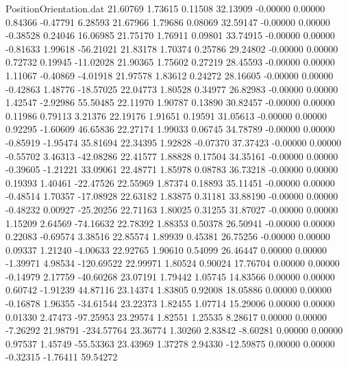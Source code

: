 \begin{filecontents}{PositionOrientation.dat}
  21.60769    1.73615    0.11508    32.13909   -0.00000    0.00000    0.84366   -0.47791    6.28593
  21.67966    1.79686    0.08069    32.59147   -0.00000    0.00000   -0.38528    0.24046   16.06985
  21.75170    1.76911    0.09801    33.74915   -0.00000    0.00000   -0.81633    1.99618  -56.21021
  21.83178    1.70374    0.25786    29.24802   -0.00000    0.00000    0.72732    0.19945  -11.02028
  21.90365    1.75602    0.27219    28.45593   -0.00000    0.00000    1.11067   -0.40869   -4.01918
  21.97578    1.83612    0.24272    28.16605   -0.00000    0.00000   -0.42863    1.48776  -18.57025
  22.04773    1.80528    0.34977    26.82983   -0.00000    0.00000    1.42547   -2.92986   55.50485
  22.11970    1.90787    0.13890    30.82457   -0.00000    0.00000    0.11986    0.79113    3.21376
  22.19176    1.91651    0.19591    31.05613   -0.00000    0.00000    0.92295   -1.60609   46.65836
  22.27174    1.99033    0.06745    34.78789   -0.00000    0.00000   -0.85919   -1.95474   35.81694
  22.34395    1.92828   -0.07370    37.37423   -0.00000    0.00000   -0.55702    3.46313  -42.08286
  22.41577    1.88828    0.17504    34.35161   -0.00000    0.00000   -0.39605   -1.21221   33.09061
  22.48771    1.85978    0.08783    36.73218   -0.00000    0.00000    0.19393    1.40461  -22.47526
  22.55969    1.87374    0.18893    35.11451   -0.00000    0.00000   -0.48514    1.70357  -17.08928
  22.63182    1.83875    0.31181    33.88190   -0.00000    0.00000   -0.48232    0.00927  -25.20256
  22.71163    1.80025    0.31255    31.87027   -0.00000    0.00000    1.15209    2.64569  -74.16632
  22.78392    1.88353    0.50378    26.50941   -0.00000    0.00000    0.22083   -0.69574    3.38516
  22.85574    1.89939    0.45381    26.75256   -0.00000    0.00000    0.09337    1.21240   -4.00633
  22.92765    1.90610    0.54099    26.46447    0.00000    0.00000   -1.39971    4.98534 -120.69522
  22.99971    1.80524    0.90024    17.76704    0.00000    0.00000   -0.14979    2.17759  -40.60268
  23.07191    1.79442    1.05745    14.83566    0.00000    0.00000    0.60742   -1.91239   44.87116
  23.14374    1.83805    0.92008    18.05886    0.00000    0.00000   -0.16878    1.96355  -34.61544
  23.22373    1.82455    1.07714    15.29006    0.00000    0.00000    0.01330    2.47473  -97.25953
  23.29574    1.82551    1.25535     8.28617    0.00000    0.00000   -7.26292   21.98791 -234.57764
  23.36774    1.30260    2.83842    -8.60281    0.00000    0.00000    0.97537    1.45749  -55.53363
  23.43969    1.37278    2.94330   -12.59875    0.00000    0.00000   -0.32315   -1.76411   59.54272

\end{filecontents}
